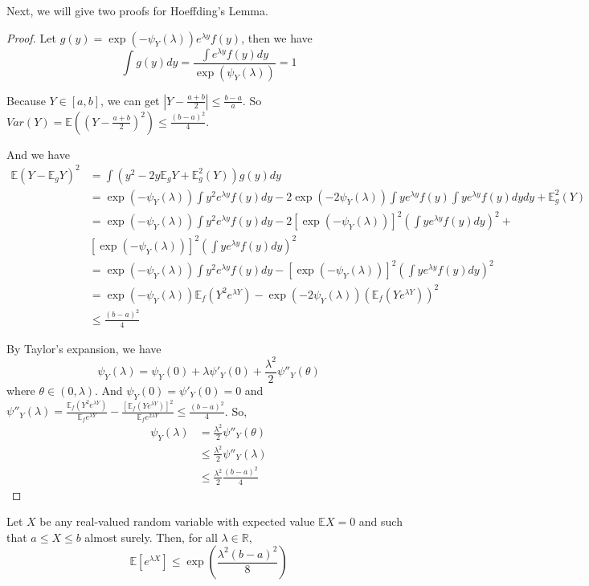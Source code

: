 \documentclass[11pt]{article}
\def\BR{{\mathbb R}}
\def\BE{{\mathbb E}}
\begin{document}
Next, we will give two proofs for Hoeffding's Lemma.

\begin{proof}
Let $g(y) = \exp(-\psi_Y(\lambda)) e^{\lambda y} f(y)$, then we have 
\[
\int g(y) dy = \frac{\int e^{\lambda y} f(y) dy}{\exp(\psi_Y(\lambda))} = 1
\]

Because $Y \in [a, b]$, we can get $|Y - \frac{a+b}{2}| \leq \frac{b - a}{a}$. So $Var(Y) = \BE ((Y - \frac{a+b}{2})^2) \leq \frac{(b-a)^2}{4}$.

And we have
\[\begin{split} 
\BE ( Y - \BE_g Y)^2 & = 
\int (y^2 - 2y\BE_gY + \BE_g^2(Y)) g(y) dy \\
&= \exp(-\psi_Y(\lambda )) \int y^2 e^{\lambda y} f(y) dy - 
2\exp(-2\psi_Y(\lambda ))\int y e^{\lambda y}f(y) \int y e^{\lambda y} f(y)dy dy + \BE_g^2(Y) \\
&= \exp(-\psi_Y(\lambda )) \int y^2 e^{\lambda y} f(y) dy -
2 [\exp(-\psi_Y(\lambda))]^2 \left(\int ye^{\lambda y}f(y) dy\right)^2 + \\
& [\exp(-\psi_Y(\lambda))]^2 \left(\int ye^{\lambda y}f(y) dy\right)^2 \\
&= \exp(-\psi_Y(\lambda )) \int y^2 e^{\lambda y} f(y) dy -
[\exp(-\psi_Y(\lambda))]^2 \left(\int ye^{\lambda y}f(y) dy\right)^2\\
& = \exp(-\psi_Y(\lambda)) \BE_f (Y^2 e^{\lambda Y}) - \exp(-2\psi_Y(\lambda))(\BE_f(Ye^{\lambda Y}))^2 \\
&\leq \frac{(b-a)^2}{4}
\end{split}\]

By Taylor's expansion, we have
\[
\psi_Y(\lambda ) = \psi_Y(0) + \lambda\psi'_Y(0) +  \frac{\lambda^2}{2} \psi''_Y(\theta)
\]
where $\theta \in (0, \lambda)$.
And $\psi_Y(0) = \psi'_Y(0) = 0$ and 
$\psi''_Y(\lambda) = \frac{\BE_f (Y^2 e^{\lambda Y})}{\BE_f e^{\lambda Y}} - \frac{[\BE_f(Ye^{\lambda Y})]^2}{\BE_f e^{2\lambda Y}} \leq \frac{(b-a)^2}{4}$.
So,
\[\begin{split}
\psi_Y(\lambda) &= \frac{\lambda^2}{2}\psi''_Y(\theta) \\
&\leq \frac{\lambda^2}{2}\psi''_Y(\lambda) \\
&\leq \frac{\lambda^2}{2} \frac{(b-a)^2}{4}
\end{split} \]
\end{proof}

Let $X$ be any real-valued random variable with expected value $\BE X = 0$ and such that $a \leq X \leq b$ almost surely. Then, for all $\lambda \in \BR$,\[ \BE[e^{\lambda X}] \leq \exp (\frac{\lambda^2 (b-a)^2}{8}) \]
\end{document}
